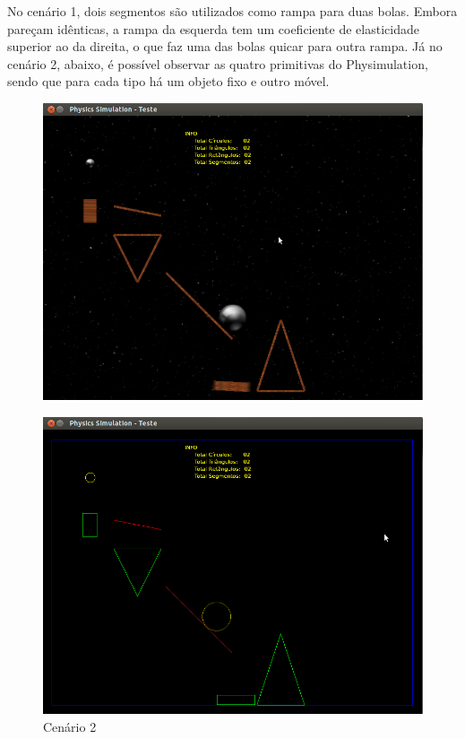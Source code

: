 No cenário 1, dois segmentos são utilizados como rampa para duas bolas. Embora pareçam idênticas, a rampa da esquerda tem um coeficiente de elasticidade superior ao da direita, o que faz uma das bolas quicar para outra rampa. Já no cenário 2, abaixo, é possível observar as quatro primitivas do Physimulation, sendo que para cada tipo há um objeto fixo e outro móvel.  

\begin{figure}[H]
  \centering
  \includegraphics[scale=0.4]{images/cenario-todos.png}
\end{figure}
\begin{figure}[H]
	\centering
	\includegraphics[scale=0.4]{images/cenario-todosE.png}
	\caption{Cenário 2}
\end{figure}

